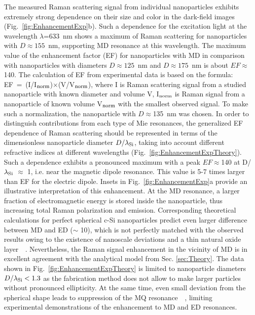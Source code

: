         The measured Raman scattering signal from individual nanoparticles exhibits extremely strong dependence on their size
        and color in the dark-field images (Fig.~\ref{fig:EnhancementExp}b). Such a dependence for the excitation light at the wavelength
        $\lambda$=633~nm shows a maximum of Raman scattering for nanoparticles with $D\approx 155$~nm, supporting MD resonance
        at this wavelength. The maximum value of the enhancement factor (EF) for nanoparticles with MD in comparison with
        nanoparticles with diameters $D\approx125$~nm and $D\approx175$~nm is about $EF\approx$140. The calculation of EF
        from experimental data is based on the formula: EF~=~(I/I$_{\rm norm}$)$\times$(V/V$_{\rm norm}$), where I is Raman
        scattering signal from a studied nanoparticle with known diameter and volume V, I$_{\rm norm}$ is Raman signal from
        a nanoparticle of known volume V$_{\rm norm}$ with the smallest observed signal. To make such a normalization, the
        nanoparticle with $D\approx$135~nm was chosen.
        In order to distinguish contributions from each type of Mie resonances, the generalized EF dependence of Raman
        scattering should be represented in terms of the dimensionless nanoparticle diameter $D/\lambda_{\rm Si}$,
        taking into account different refractive indices at different wavelengths (Fig.~\ref{fig:EnhancementExpTheory}). Such a dependence
        exhibits a pronounced maximum with a peak $EF\approx$140 at D/$\lambda_{\rm Si}$ $\approx$ 1, i.e. near the
        magnetic dipole resonance. This value is 5-7 times larger than EF for the electric dipole. Insets in Fig.~\ref{fig:EnhancementExp}a
        provide an illustrative interpretation of this enhancement. At the MD resonance, a larger fraction of electromagnetic
        energy is stored inside the nanoparticle, thus increasing total Raman polarization and emission.
        Corresponding theoretical calculations for perfect spherical c-Si nanoparticles predict even larger difference between
        MD and ED ($\sim$ 10), which is not perfectly matched with the observed results owing to the existence of nanoscale
        deviations and a thin natural oxide layer~~\cite{fu2012directional, zywietz2015electromagnetic}. Nevertheless, the
        Raman signal enhancement in the vicinity of MD is in excellent agreement with the analytical model from Sec. \ref{sec:Theory}.
        The data shown in Fig.~\ref{fig:EnhancementExpTheory} is limited to nanoparticle diameters $D/\lambda_{\rm Si}<1.3$ as the fabrication method
        does not allow to make larger particles without pronounced ellipticity. At the same time, even small deviation from the spherical shape leads to
        suppression of the MQ resonance~~\cite{fu2012directional}, limiting experimental demonstrations of the enhancement to MD and ED resonances.

